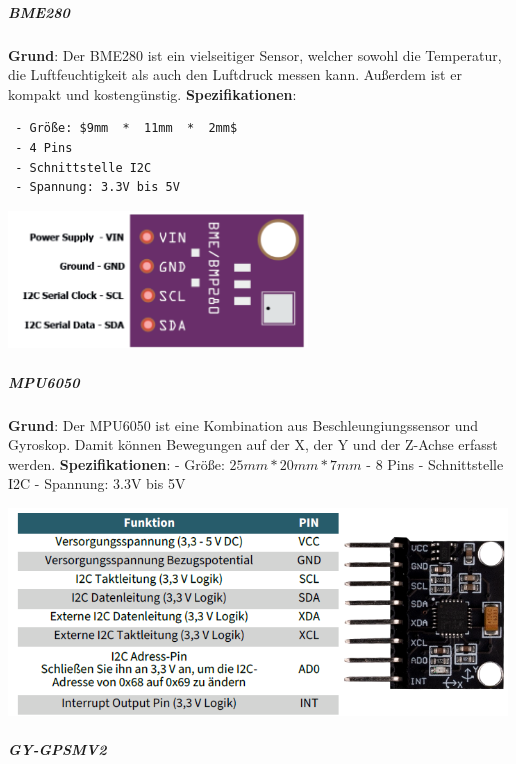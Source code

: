 \documentclass[
    headings=optiontotocandhead,%
    twoside,
    numbers=noenddot,%
    12pt, %
    titlepage, %
    parskip=full, %
    listof=leveldown, 
    numbers=noenddot, %
    a4paper,DIV=14,
    BCOR=15mm,
]{scrbook}
\let\origfigure=\figure
\let\endorigfigure=\endfigure
\renewenvironment{figure}[1][]{%
   \origfigure[H]
}{%
   \endorigfigure
}
\begin{document}
\hypertarget{bme280-1}{%
\subparagraph{BME280}\label{bme280-1}}

\textbf{Grund}: Der BME280 ist ein vielseitiger Sensor, welcher sowohl
die Temperatur, die Luftfeuchtigkeit als auch den Luftdruck messen kann.
Außerdem ist er kompakt und kostengünstig. \textbf{Spezifikationen}:

\begin{lstlisting}
 - Größe: $9mm  *  11mm  *  2mm$
 - 4 Pins
 - Schnittstelle I2C
 - Spannung: 3.3V bis 5V
\end{lstlisting}

\begin{figure}
\centering
\includegraphics[width=3.125in,height=\textheight]{img/Kampl/BME280-Pins.png}
\caption{BMEPins {[}\protect\hyperlink{ref-BME280-Datenblatt}{10}{]}}
\end{figure}

\hypertarget{mpu6050-1}{%
\subparagraph{MPU6050}\label{mpu6050-1}}

\textbf{Grund}: Der MPU6050 ist eine Kombination aus
Beschleungiungssensor und Gyroskop. Damit können Bewegungen auf der X,
der Y und der Z-Achse erfasst werden. \textbf{Spezifikationen}: - Größe:
\(25mm * 20mm * 7mm\) - 8 Pins - Schnittstelle I2C - Spannung: 3.3V bis
5V

\begin{figure}
\centering
\includegraphics[width=5.20833in,height=\textheight]{img/Kampl/MPU6050-Pins.png}
\caption{MPUPins {[}\protect\hyperlink{ref-MPU6050-Datenblatt}{11}{]}}
\end{figure}

\hypertarget{gy-gpsmv2-1}{%
\subparagraph{GY-GPSMV2}\label{gy-gpsmv2-1}}
\end{document}
